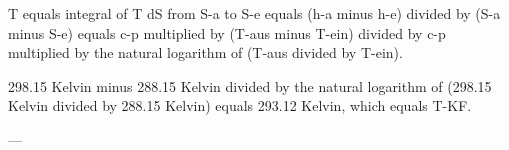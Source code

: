 T equals integral of T dS from S-a to S-e equals (h-a minus h-e) divided by (S-a minus S-e) equals c-p multiplied by (T-aus minus T-ein) divided by c-p multiplied by the natural logarithm of (T-aus divided by T-ein).  

298.15 Kelvin minus 288.15 Kelvin divided by the natural logarithm of (298.15 Kelvin divided by 288.15 Kelvin) equals 293.12 Kelvin, which equals T-KF.  

---